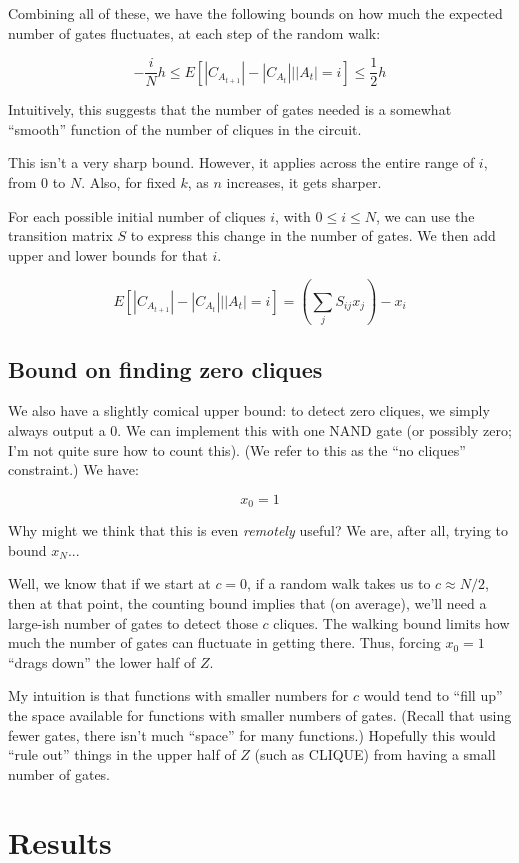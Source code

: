 \documentclass[12pt]{article}
\theoremstyle{definition}
\begin{document}
Combining all of these, we have the following bounds on how much the
expected number of gates fluctuates, at each step of the random walk:

\[
-\frac{i}{N}h \le E[ |C_{A_{t+1}}| - |C_{A_t}| | |A_t|=i ] \le \frac{1}{2}h
\]

Intuitively, this suggests that the number
of gates needed is a somewhat ``smooth'' function of the
number of cliques in the circuit.

This isn't a very sharp bound. However, it applies across the entire
range of $i$, from 0 to $N$. Also, for fixed $k$, as $n$ increases,
it gets sharper.

For each possible initial number of cliques $i$, with $0 \le i \le N$,
we can use the transition matrix $S$ to express this change in the
number of gates. We then add upper and lower bounds for that $i$.

\[
E[ |C_{A_{t+1}}| - |C_{A_t}| | |A_t|=i ] = (\sum_j S_{ij} x_j) - x_i
\]

\subsection{Bound on finding zero cliques}

We also have a slightly comical upper bound:
to detect zero cliques, we simply always
output a 0. We can implement this with one NAND gate (or possibly zero;
I'm not quite sure how to count this). (We refer to this as the
``no cliques'' constraint.) We have:

\[
x_0 = 1
\]

Why might we think that this is even {\em remotely} useful? We are, after
all, trying to bound $x_N$...

Well, we know that if we start at $c=0$, if a random walk takes us to
$c \approx N/2$, then at that point, the counting bound implies that
(on average), we'll need a large-ish number of gates to detect those $c$ cliques.
The walking bound limits how much the number of gates can fluctuate
in getting there. Thus, forcing $x_0=1$ ``drags down'' the lower half of $Z$.

My intuition is that functions with smaller numbers for $c$ would
tend to ``fill up'' the space available for functions with smaller numbers of gates.
(Recall that using fewer gates, there isn't much ``space'' for many functions.)
Hopefully this would ``rule out'' things in the upper half of $Z$ (such as CLIQUE)
from having a small number of gates.

\section{Results}
\end{document}

